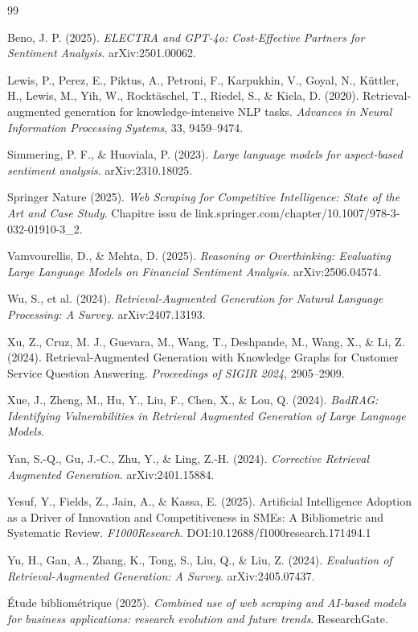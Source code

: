\begin{thebibliography}{99}

Beno, J. P. (2025). \textit{ELECTRA and GPT-4o: Cost-Effective Partners for Sentiment Analysis}. arXiv:2501.00062.

Lewis, P., Perez, E., Piktus, A., Petroni, F., Karpukhin, V., Goyal, N., Küttler, H., Lewis, M., Yih, W.,
Rocktäschel, T., Riedel, S., \& Kiela, D. (2020). Retrieval-augmented generation for knowledge-intensive NLP
tasks. \textit{Advances in Neural Information Processing Systems}, 33, 9459--9474.

Simmering, P. F., \& Huoviala, P. (2023). \textit{Large language models for aspect-based sentiment
analysis}. arXiv:2310.18025.

Springer Nature (2025). \textit{Web Scraping for Competitive Intelligence: State of the Art and Case Study}.
Chapitre issu de link.springer.com/chapter/10.1007/978-3-032-01910-3\_2.

Vamvourellis, D., \& Mehta, D. (2025). \textit{Reasoning or Overthinking: Evaluating Large Language Models on
Financial Sentiment Analysis}. arXiv:2506.04574.

Wu, S., et al. (2024). \textit{Retrieval-Augmented Generation for Natural Language Processing: A Survey}.
arXiv:2407.13193.

Xu, Z., Cruz, M. J., Guevara, M., Wang, T., Deshpande, M., Wang, X., \& Li, Z. (2024). Retrieval-Augmented
Generation with Knowledge Graphs for Customer Service Question Answering. \textit{Proceedings of SIGIR
2024}, 2905--2909.

Xue, J., Zheng, M., Hu, Y., Liu, F., Chen, X., \& Lou, Q. (2024). \textit{BadRAG: Identifying Vulnerabilities
in Retrieval Augmented Generation of Large Language Models}.

Yan, S.-Q., Gu, J.-C., Zhu, Y., \& Ling, Z.-H. (2024). \textit{Corrective Retrieval Augmented Generation}.
arXiv:2401.15884.

Yesuf, Y., Fields, Z., Jain, A., \& Kassa, E. (2025). Artificial Intelligence Adoption as a Driver of
Innovation and Competitiveness in SMEs: A Bibliometric and Systematic Review. \textit{F1000Research}.
DOI:10.12688/f1000research.171494.1

Yu, H., Gan, A., Zhang, K., Tong, S., Liu, Q., \& Liu, Z. (2024). \textit{Evaluation of Retrieval-Augmented
Generation: A Survey}. arXiv:2405.07437.

Étude bibliométrique (2025). \textit{Combined use of web scraping and AI-based models for business
applications: research evolution and future trends}. ResearchGate.

\end{thebibliography}

